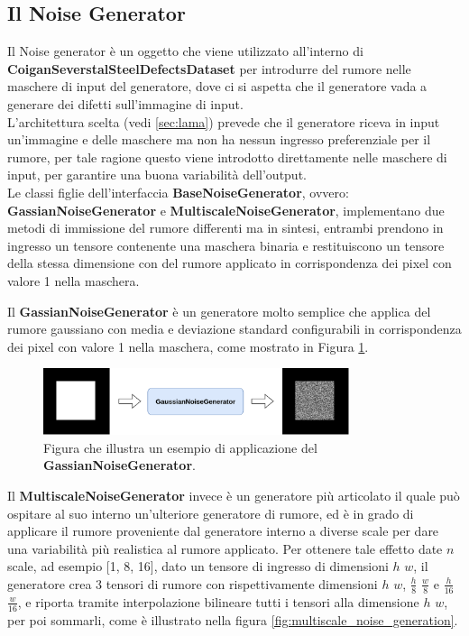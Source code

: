 \subsection{Il Noise Generator}
Il Noise generator è un oggetto che viene utilizzato all'interno di \textbf{CoiganSeverstalSteelDefectsDataset} per introdurre del
rumore nelle maschere di input del generatore, dove ci si aspetta che il generatore vada a generare dei difetti sull'immagine di input.\\
L'architettura scelta (vedi \ref{sec:lama}) prevede che il generatore riceva in input un'immagine e delle maschere ma
non ha nessun ingresso preferenziale per il rumore, per tale ragione questo viene introdotto 
direttamente nelle maschere di input, per garantire una buona variabilità dell'output.\\
Le classi figlie dell'interfaccia \textbf{BaseNoiseGenerator}, ovvero: \textbf{GassianNoiseGenerator} e \textbf{MultiscaleNoiseGenerator},
implementano due metodi di immissione del rumore differenti ma in sintesi, entrambi prendono in ingresso un tensore contenente una maschera
binaria e restituiscono un tensore della stessa dimensione con del rumore applicato in corrispondenza dei pixel con valore 1 nella maschera.

Il \textbf{GassianNoiseGenerator} è un generatore molto semplice che applica del rumore gaussiano con media e deviazione standard configurabili
in corrispondenza dei pixel con valore 1 nella maschera, come mostrato in Figura \ref{fig:gaussian_noise}.

\begin{figure}[H]
    \centering
    \includegraphics[width=0.8\textwidth]{imgs/Coigan/gaussian noise generator.drawio.png}
    \caption{Figura che illustra un esempio di applicazione del \textbf{GassianNoiseGenerator}.}
    \label{fig:gaussian_noise}
\end{figure}

Il \textbf{MultiscaleNoiseGenerator} invece è un generatore più articolato il quale può ospitare al suo interno un'ulteriore 
generatore di rumore, ed è in grado di applicare il rumore proveniente dal generatore interno a diverse scale per dare una variabilità più realistica al rumore applicato.
Per ottenere tale effetto date $n$ scale, ad esempio [1, 8, 16], dato un tensore di ingresso di dimensioni $h$ $w$, il generatore crea 3 tensori di rumore con rispettivamente
dimensioni $h$ $w$, $\frac{h}{8}$ $\frac{w}{8}$ e $\frac{h}{16}$ $\frac{w}{16}$, e riporta tramite interpolazione bilineare tutti i tensori alla dimensione $h$ $w$,
per poi sommarli, come è illustrato nella figura \ref{fig:multiscale_noise_generation}.

